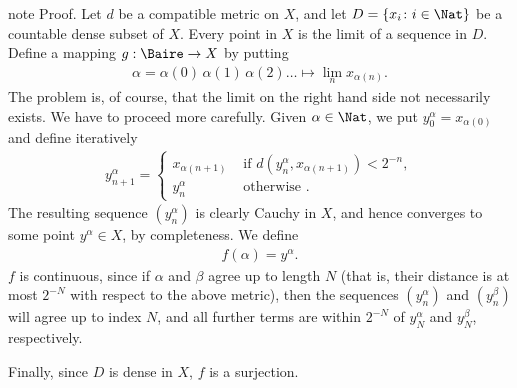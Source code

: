 \documentclass[letterpaper,10pt,english]{jupyterBook}
\begin{document}
\begin{sphinxadmonition}{note}
\sphinxAtStartPar
Proof. Let \(d\) be a compatible metric on \(X\), and let \(D = \{x_i \colon i \in \Nat\}\) be a countable dense subset of \(X\). Every point in \(X\) is the limit of a sequence in \(D\). Define a mapping \(g:\Baire \to X\) by putting
\begin{equation*}
\begin{split}
    \alpha = \alpha(0)\, \alpha(1)\, \alpha(2)\dots \mapsto \lim_n x_{\alpha(n)}.
\end{split}
\end{equation*}
\sphinxAtStartPar
The problem is, of course, that the limit on the right hand side not necessarily exists. We have to proceed more carefully.
Given \(\alpha \in \Nat\), we put \(y^\alpha_0 = x_{\alpha(0)}\) and
define iteratively
\begin{equation*}
\begin{split}
y^\alpha_{n+1} = \begin{cases}
    x_{\alpha(n+1)} & \text{ if $d(y^\alpha_n,x_{\alpha(n+1)}) < 2^{-n}$}, \\
    y^\alpha_n & \text{ otherwise }.
\end{cases}
\end{split}
\end{equation*}
\sphinxAtStartPar
The resulting sequence \((y^\alpha_n)\) is clearly Cauchy in \(X\), and hence converges to some point \(y^\alpha \in X\), by completeness. We define
\begin{equation*}
\begin{split}
    f(\alpha) = y^\alpha.
\end{split}
\end{equation*}
\sphinxAtStartPar
\(f\) is continuous, since if \(\alpha\) and \(\beta\) agree up to length \(N\) (that is, their distance is at most \(2^{-N}\) with respect to the above metric), then the sequences \((y^\alpha_n)\) and \((y^\beta_n)\) will agree up to index \(N\), and all further terms are within \(2^{-N}\) of \(y^\alpha_N\) and \(y^\beta_N\), respectively.

\sphinxAtStartPar
Finally, since \(D\) is dense in \(X\), \(f\) is a surjection.
\end{sphinxadmonition}

\sphinxstepscope
\end{document}
